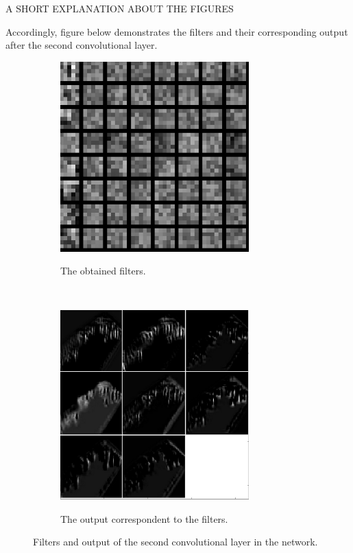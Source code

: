 A SHORT EXPLANATION ABOUT THE FIGURES

Accordingly, figure below demonstrates the filters and their corresponding output after the second convolutional layer. 

\begin{figure}[h!]
    \centering
    \begin{subfigure}[t]{0.5\textwidth}
        \centering
        {\includegraphics[width=0.8\textwidth]{images/conv2feat}}
        \caption{The obtained filters.}
    \end{subfigure}%
    ~ 
    \begin{subfigure}[t]{0.5\textwidth}
        \centering
        {\includegraphics[width=0.8\textwidth]{images/conv2out}}
        \caption{The output correspondent to the filters.}
    \end{subfigure}
    \caption{Filters and output of the second convolutional layer in the network.}
    \label{fig:conv2tot}
\end{figure}

